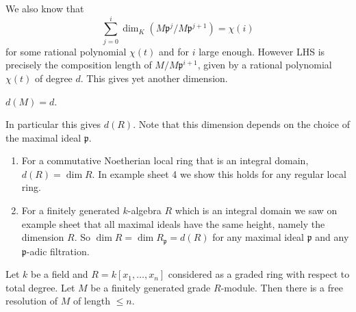 \documentclass[a4paper]{article}
\begin{document}
We also know that
\[
  \sum_{j = 0}^i \dim_K (M \mathfrak p^j/M \mathfrak p^{j + 1}) = \chi(i)
\]
for some rational polynomial \(\chi(t)\) and for \(i\) large enough. However LHS is precisely the composition length of \(M /M \mathfrak p^{i + 1}\), given by a rational polynomial \(\chi(t)\) of degree \(d\). This gives yet another dimension.

\begin{definition}
  \(d(M) = d\).
\end{definition}

In particular this gives \(d(R)\). Note that this dimension depends on the choice of the maximal ideal \(\mathfrak p\).

\begin{remark}\leavevmode
  \begin{enumerate}
  \item For a commutative Noetherian local ring that is an integral domain, \(d(R) = \dim R\). In example sheet 4 we show this holds for any regular local ring.
  \item For a finitely generated \(k\)-algebra \(R\) which is an integral domain we saw on example sheet that all maximal ideals have the same height, namely the dimension \(R\). So \(\dim R = \dim R_{\mathfrak p} = d(R)\) for any maximal ideal \(\mathfrak p\) and any \(\mathfrak p\)-adic filtration.
  \end{enumerate}
\end{remark}

\begin{theorem}
  Let \(k\) be a field and \(R = k[x_1, \dots, x_n]\) considered as a graded ring with respect to total degree. Let \(M\) be a finitely generated grade \(R\)-module. Then there is a free resolution of \(M\) of length \(\leq n\).
\end{theorem}
\end{document}
